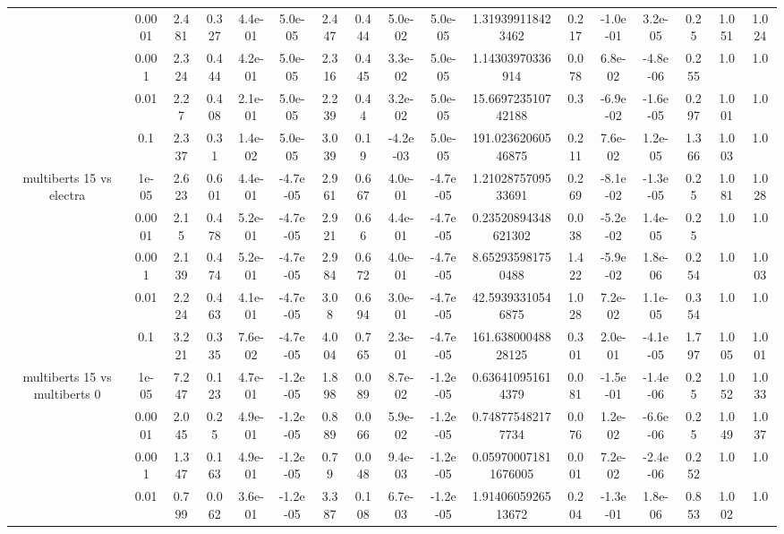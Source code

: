 \begin{tabular}{|c|c|c|c|c|c|c|c|c|c|c|c|c|c|c|c|c|}
 & 0.0001 & 2.481 & 0.327 & 4.4e-01 & 5.0e-05 & 2.447 & 0.444 & 5.0e-02 & 5.0e-05 & 1.319399118423462 & 0.217 & -1.0e-01 & 3.2e-05 & 0.25 & 1.051 & 1.024 \\
 & 0.001 & 2.324 & 0.444 & 4.2e-01 & 5.0e-05 & 2.316 & 0.445 & 3.3e-02 & 5.0e-05 & 1.14303970336914 & 0.078 & 6.8e-02 & -4.8e-06 & 0.255 & 1.0 & 1.0 \\
 & 0.01 & 2.27 & 0.408 & 2.1e-01 & 5.0e-05 & 2.239 & 0.44 & 3.2e-02 & 5.0e-05 & 15.669723510742188 & 0.3 & -6.9e-02 & -1.6e-05 & 0.297 & 1.001 & 1.0 \\
 & 0.1 & 2.337 & 0.31 & 1.4e-02 & 5.0e-05 & 3.039 & 0.19 & -4.2e-03 & 5.0e-05 & 191.02362060546875 & 0.211 & 7.6e-02 & 1.2e-05 & 1.366 & 1.003 & 1.0 \\
\hline
\multirow{5}{*}{multiberts 15 vs electra } & 1e-05 & 2.623 & 0.601 & 4.4e-01 & -4.7e-05 & 2.961 & 0.667 & 4.0e-01 & -4.7e-05 & 1.2102875709533691 & 0.269 & -8.1e-02 & -1.3e-05 & 0.25 & 1.081 & 1.028 \\
 & 0.0001 & 2.15 & 0.478 & 5.2e-01 & -4.7e-05 & 2.921 & 0.66 & 4.4e-01 & -4.7e-05 & 0.23520894348621302 & 0.038 & -5.2e-02 & 1.4e-05 & 0.25 & 1.0 & 1.0 \\
 & 0.001 & 2.139 & 0.474 & 5.2e-01 & -4.7e-05 & 2.984 & 0.672 & 4.0e-01 & -4.7e-05 & 8.652935981750488 & 1.422 & -5.9e-02 & 1.8e-06 & 0.254 & 1.0 & 1.003 \\
 & 0.01 & 2.224 & 0.463 & 4.1e-01 & -4.7e-05 & 3.08 & 0.694 & 3.0e-01 & -4.7e-05 & 42.59393310546875 & 1.028 & 7.2e-02 & 1.1e-05 & 0.354 & 1.0 & 1.0 \\
 & 0.1 & 3.221 & 0.335 & 7.6e-02 & -4.7e-05 & 4.004 & 0.765 & 2.3e-01 & -4.7e-05 & 161.63800048828125 & 0.301 & 2.0e-01 & -4.1e-05 & 1.797 & 1.005 & 1.001 \\
\hline
\multirow{5}{*}{multiberts 15 vs multiberts 0} & 1e-05 & 7.247 & 0.123 & 4.7e-01 & -1.2e-05 & 1.898 & 0.089 & 8.7e-02 & -1.2e-05 & 0.636410951614379 & 0.081 & -1.5e-01 & -1.4e-06 & 0.25 & 1.052 & 1.033 \\
 & 0.0001 & 2.045 & 0.25 & 4.9e-01 & -1.2e-05 & 0.889 & 0.066 & 5.9e-02 & -1.2e-05 & 0.748775482177734 & 0.076 & 1.2e-02 & -6.6e-06 & 0.25 & 1.049 & 1.037 \\
 & 0.001 & 1.347 & 0.163 & 4.9e-01 & -1.2e-05 & 0.79 & 0.048 & 9.4e-03 & -1.2e-05 & 0.059700071811676005 & 0.001 & 7.2e-02 & -2.4e-06 & 0.252 & 1.0 & 1.0 \\
 & 0.01 & 0.799 & 0.062 & 3.6e-01 & -1.2e-05 & 3.387 & 0.108 & 6.7e-03 & -1.2e-05 & 1.9140605926513672 & 0.204 & -1.3e-01 & 1.8e-06 & 0.853 & 1.002 & 1.0 \\

\end{tabular}
